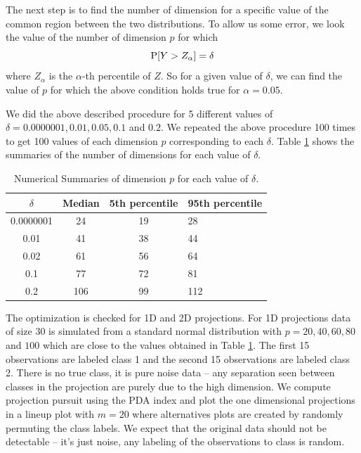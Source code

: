 \documentclass[12]{article}
\begin{document}
The next step is to find the number of dimension for a specific value of the common region between the two distributions. To allow us some error, we look the value of the number of dimension $p$ for which $$\hbox{P}[Y > Z_{\alpha}] = \delta$$ where $Z_{\alpha}$ is the $\alpha$-th percentile of $Z$.  So for a given value of $\delta$, we can find the value of $p$ for which the above condition holds true for $\alpha = 0.05$.

We did the above described procedure for 5 different values of $\delta  = 0.0000001, 0.01, 0.05, 0.1$ and $0.2$. We repeated the above procedure 100 times to get 100 values of each dimension $p$ corresponding to each $\delta$. Table \ref{tab:dimen} shows the summaries of the number of dimensions for each value of $\delta$.

\begin{table}[htbp]
\begin{center}
\caption{Numerical Summaries of dimension $p$ for each value of $\delta$.}
\begin{tabular}{cccp{3cm}}
  \hline
  \hline
  $\delta$ & Median & 5th percentile & 95th percentile \\
  \hline
  0.0000001 & 24 & 19 & 28 \\
      0.01 & 41 & 38 & 44\\
   0.02 & 61 & 56 & 64 \\
     0.1 & 77 & 72 & 81\\   
     0.2 & 106 & 99 & 112\\ 
      \hline
\end{tabular}
\label{tab:dimen}
\end{center}
\end{table}

The optimization is checked for 1D and 2D projections. For 1D projections data of size 30 is simulated from a standard normal distribution with $ p=20, 40, 60, 80$ and $100$ which are close to the values obtained in Table \ref{tab:dimen}. The first 15 observations are labeled class 1 and the second 15 observations are labeled class 2. There is no true class, it is pure noise data -- any separation seen between classes in the projection are purely due to the high dimension. We compute projection pursuit using the PDA index and plot the one dimensional projections in a lineup plot with $m=20$ where alternatives plots are created by randomly permuting the class labels. We expect that the original data should not be detectable -- it's just noise, any labeling of the observations to class is random. 
\end{document}
